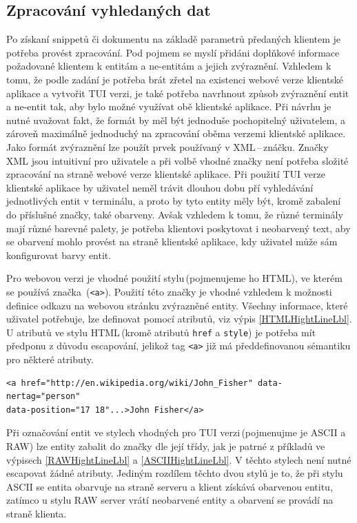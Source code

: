 \subsection*{Zpracování vyhledaných dat}
\label{dataProcessing}
Po získaní snippetů či dokumentu na základě parametrů předaných klientem je potřeba provést zpracování. Pod pojmem  se myslí přidáni doplňkové informace požadované klientem k entitám a ne-entitám a jejich zvýraznění. Vzhledem k tomu, že podle zadání je potřeba brát zřetel na existenci webové verze klientské aplikace a vytvořit TUI verzi, je také potřeba navrhnout způsob zvýraznění entit a ne-entit tak, aby bylo možné využívat obě klientské aplikace. Při návrhu je nutné uvažovat fakt, že formát by měl být jednoduše pochopitelný uživatelem, a zároveň maximálně jednoduchý na zpracování oběma verzemi klientské aplikace. Jako formát zvýraznění lze použít prvek používaný v XML\,--\,znáčku. Značky XML jsou intuitivní pro uživatele a při volbě vhodné značky není potřeba složité zpracování na straně webové verze klientské aplikace. Při použití TUI verze klientské aplikace by uživatel neměl trávit dlouhou dobu pří vyhledávání jednotlivých entit v terminálu, a proto by tyto entity měly být, kromě zabalení do příslušné značky, také obarveny. Avšak vzhledem k tomu, že různé terminály mají různé barevné palety, je potřeba klientovi poskytovat i neobarvený text, aby se obarvení mohlo provést na straně klientské aplikace, kdy uživatel může sám konfigurovat barvy entit.


Pro webovou verzi je vhodné použití stylu\,(pojmenujeme ho HTML), ve kterém se používá značka \,(\texttt{<a>}). Použití této značky je vhodné vzhledem k možnosti definice odkazu na webovou stránku zvýrazněné entity. Všechny informace, které uživatel potřebuje, lze definovat pomocí atributů, viz výpis \ref{HTMLHightLineLbl}. U atributů ve stylu HTML\,(kromě atributů \texttt{href} a \texttt{style}) je potřeba mít předponu  z důvodu escapování, jelikož tag \texttt{<a>} již má předdefinovanou sémantiku pro některé atributy. 


\begin{lstlisting}[caption={Zvýraznění ve stylu HTML}, label={HTMLHightLineLbl}, captionpos=b]
<a href="http://en.wikipedia.org/wiki/John_Fisher" data-nertag="person"
data-position="17 18"...>John Fisher</a>
\end{lstlisting}
 


Při označování entit ve stylech vhodných pro TUI verzi\,(pojmenujme je ASCII a RAW) lze entity zabalit do značky dle její třídy, jak je patrné z příkladů ve výpisech \ref{RAWHightLineLbl} a \ref{ASCIIHightLineLbl}. V těchto stylech není nutné escapovat žádné atributy. Jediným rozdílem těchto dvou stylů je to, že při stylu ASCII se entita obarvuje na straně serveru a klient získává obarvenou entitu, zatímco u stylu RAW server vrátí neobarvené entity a obarvení se provádí na straně klienta.

